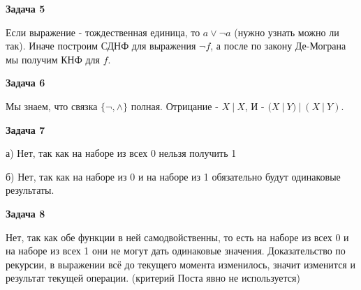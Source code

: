 \begin{center}
\textbf{Задача 5}
\end{center}
Если выражение - тождественная единица, то $\displaystyle a\lor \neg a$ (нужно узнать можно ли так). Иначе построим СДНФ для выражения $\displaystyle \neg f$, а после по закону Де-Мограна мы получим КНФ для $\displaystyle f$.

\begin{center}
\textbf{Задача 6}
\end{center}
Мы знаем, что связка $\displaystyle \{\neg ,\land \}$ полная. Отрицание - $\displaystyle X\ |\ X$, И - $\displaystyle ( X\ |\ Y) \ |\ ( X\ |\ Y)$.

\begin{center}
\textbf{Задача 7}
\end{center}
а) Нет, так как на наборе из всех 0 нельзя получить 1

б) Нет, так как на наборе из 0 и на наборе из 1 обязательно будут одинаковые результаты.

\begin{center}
\textbf{Задача 8}
\end{center}
Нет, так как обе функции в ней самодвойственны, то есть на наборе из всех 0 и на наборе из всех 1 они не могут дать одинаковые значения. Доказательство по рекурсии, в выражении всё до текущего момента изменилось, значит изменится и результат текущей операции. (критерий Поста явно не используется)

